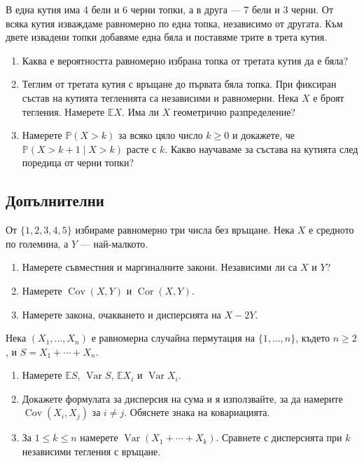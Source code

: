 \documentclass[11pt,a4paper]{article}
\newenvironment{enumeratea}{\begin{enumerate}[label=(\alph*),itemsep=0.28em,topsep=0.25em]}{\end{enumerate}}
\newcommand{\Pbb}{\mathbb P}
\newcommand{\Ebb}{\mathbb E}
\newcommand{\Var}{\operatorname{Var}}
\newcommand{\Cov}{\operatorname{Cov}}
\newcommand{\Cor}{\operatorname{Cor}}
\newcounter{problem}[section]
\begin{document}
\begin{problempencil}
В една кутия има 4 бели и 6 черни топки, а в друга --- 7 бели и 3 черни.
От всяка кутия изваждаме равномерно по една топка, независимо от другата.
Към двете извадени топки добавяме една бяла и поставяме трите в трета кутия.
\begin{enumeratea}
  \item Каква е вероятността равномерно избрана топка от третата кутия
  да е бяла?
  \item Теглим от третата кутия с връщане до първата бяла топка. При фиксиран
  състав на кутията тегленията са независими и равномерни.
  Нека $X$ е броят тегления. Намерете $\Ebb X$.
  Има ли $X$ геометрично разпределение?
  \item Намерете $\Pbb(X>k)$ за всяко цяло число $k\ge0$ и докажете, че
  $\Pbb(X>k+1\mid X>k)$ расте с $k$.
  Какво научаваме за състава на кутията след поредица от черни топки?
\end{enumeratea}
\end{problempencil}

\subsection*{Допълнителни}

\begin{problembook}
От $\{1,2,3,4,5\}$ избираме равномерно три числа без връщане. Нека $X$ е
средното по големина, а $Y$ --- най-малкото.
\begin{enumeratea}
  \item Намерете съвместния и маргиналните закони.
  Независими ли са $X$ и $Y$?
  \item Намерете $\Cov(X,Y)$ и $\Cor(X,Y)$.
  \item Намерете закона, очакването и дисперсията на $X-2Y$.
\end{enumeratea}
\end{problembook}

\begin{problempencil}
Нека $(X_1,\ldots,X_n)$ е равномерна случайна пермутация на
$\{1,\ldots,n\}$, където $n\ge2$, и $S=X_1+\cdots+X_n$.
\begin{enumeratea}
  \item Намерете $\Ebb S$, $\Var S$, $\Ebb X_i$ и $\Var X_i$.
  \item Докажете формулата за дисперсия на сума и я използвайте, за да
  намерите $\Cov(X_i,X_j)$ за $i\ne j$. Обяснете знака на ковариацията.
  \item За $1\le k\le n$ намерете $\Var(X_1+\cdots+X_k)$.
  Сравнете с дисперсията при $k$ независими тегления с връщане.
\end{enumeratea}
\end{problempencil}
\end{document}
